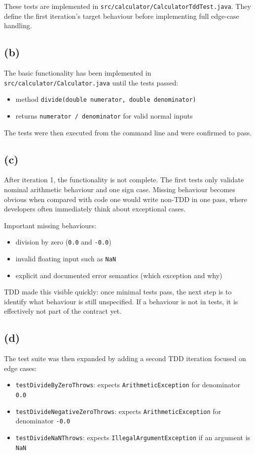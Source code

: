 These tests are implemented in \texttt{src/calculator/CalculatorTddTest.java}. They define the first iteration's target behaviour before implementing full edge-case handling.

\subsection{(b)}
The basic functionality has been implemented in \texttt{src/calculator/Calculator.java} until the tests passed:
\begin{itemize}
    \item method \texttt{divide(double numerator, double denominator)}
    \item returns \texttt{numerator / denominator} for valid normal inputs
\end{itemize}

The tests were then executed from the command line and were confirmed to pass.

\subsection{(c)}
After iteration 1, the functionality is not complete. The first tests only validate nominal arithmetic behaviour and one sign case. Missing behaviour becomes obvious when compared with code one would write non-TDD in one pass, where developers often immediately think about exceptional cases.

Important missing behaviours:
\begin{itemize}
    \item division by zero (\texttt{0.0} and \texttt{-0.0})
    \item invalid floating input such as \texttt{NaN}
    \item explicit and documented error semantics (which exception and why)
\end{itemize}

TDD made this visible quickly: once minimal tests pass, the next step is to identify what behaviour is still unspecified. If a behaviour is not in tests, it is effectively not part of the contract yet.

\subsection{(d)}
The test suite was then expanded by adding a second TDD iteration focused on edge cases:
\begin{itemize}
    \item \texttt{testDivideByZeroThrows}: expects \texttt{ArithmeticException} for denominator \texttt{0.0}
    \item \texttt{testDivideNegativeZeroThrows}: expects \texttt{ArithmeticException} for denominator \texttt{-0.0}
    \item \texttt{testDivideNaNThrows}: expects \texttt{IllegalArgumentException} if an argument is \texttt{NaN}
\end{itemize}

